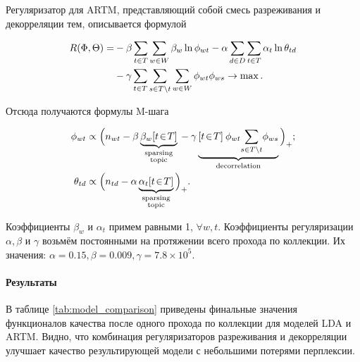 \documentclass{article}
\begin{document}
Регуляризатор для ARTM, представляющий собой смесь разреживания и декорреляции тем, описывается формулой

\begin{align}
    R(\Phi,\Theta)
    =&
    - \beta \sum_{t\in T} \sum_{w\in W} \beta_w \ln \phi_{wt}
    - \alpha \sum_{d\in D} \sum_{t\in T} \alpha_t \ln \theta_{td}
    \notag
\\  {}&
    - \gamma
        \sum_{t\in T}
        \sum_{s\in T\backslash t}
        \sum_{w\in W} \phi_{wt}\phi_{ws}
    \to \max.
\end{align}

Отсюда получаются формулы M-шага

\begin{align}
    \phi_{wt} &\propto
        \Bigl(n_{wt}
            - \beta \underbrace{\beta_{w} [t\!\in\! T]}_{\substack{\text{sparsing}\\\text{topic}}} {}
            - \gamma \underbrace{[t\!\in\! T]\: \phi_{wt} \!\sum_{s\in T\backslash t}\! \phi_{ws}}_{\text{decorrelation}} {}
        \Bigr)_{+};
\\
    \theta_{td} &\propto
        \Bigl(n_{td}
            - \alpha \underbrace{\alpha_{t} [t\!\in\! T]}_{\substack{\text{sparsing}\\\text{topic}}} {}
        \Bigr)_{+}.
\end{align}

Коэффициенты $\beta_w$ и $\alpha_t$ примем равными 1, $\forall w,t$. Коэффициенты регуляризации $\alpha,  \beta$ и $\gamma$ возьмём постоянными на протяжении всего прохода по коллекции. Их значения: $\alpha = 0.15, \beta = 0.009, \gamma = 7.8 \times 10^5$.

\paragraph{Результаты} В таблице \ref{tab:model_comparison} приведены финальные значения функционалов качества после одного прохода по коллекции для моделей LDA и ARTM. Видно, что комбинация регуляризаторов разреживания и декорреляции улучшает качество результирующей модели с небольшими потерями перплексии.
\end{document}
